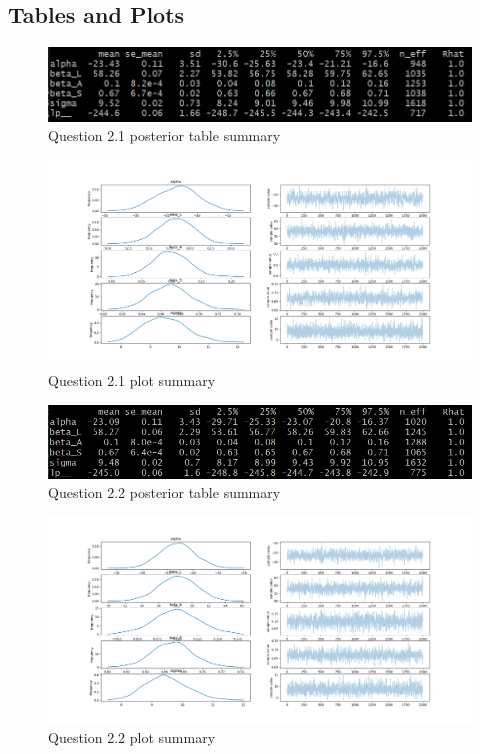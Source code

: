 \documentclass[11pt,a4paper,titlepage]{article}
\begin{document}
\begin{appendices}
  \section{Tables and Plots}
    \begin{figure}[htb]
      \centering
        \includegraphics[width=\textwidth]{../q21/q21_summary_table.png}
        \caption{Question 2.1 posterior table summary}
      \label{tab:2.1}
    \end{figure}

    \begin{figure}[htb]
      \centering
        \includegraphics[width=\textwidth]{../q21/separated_features.png}
        \caption{Question 2.1 plot summary}
      \label{fig:2.1}
    \end{figure}

    \begin{figure}[htb]
      \centering
        \includegraphics[width=\textwidth]{../q22/q22_table_summary.png}
        \caption{Question 2.2 posterior table summary}
      \label{tab:2.2}
    \end{figure}

    \begin{figure}[htb]
      \centering
        \includegraphics[width=\textwidth]{../q22/q22_plot_summary.png}
        \caption{Question 2.2 plot summary}
      \label{fig:2.2}
    \end{figure}


\end{appendices}
\end{document}
